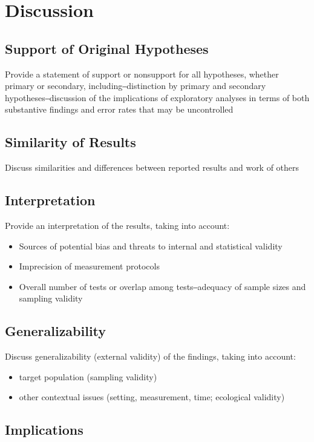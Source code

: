\documentclass[acmsmall]{acmart}
\begin{document}
\section{Discussion}
\subsection{Support of Original Hypotheses}
Provide a statement of support or nonsupport for all hypotheses, whether primary or secondary, including‒distinction by primary and secondary hypotheses‒discussion of the implications of exploratory analyses in terms of both substantive findings and error rates that may be uncontrolled

\subsection{Similarity of Results}
Discuss similarities and differences between reported results and work of others

\subsection{Interpretation}

Provide an interpretation of the results, taking into account:

\begin{itemize}
    \item Sources of potential bias and threats to internal and statistical validity
    \item Imprecision of measurement protocols
    \item Overall number of tests or overlap among tests‒adequacy of sample sizes and sampling validity
\end{itemize}


\subsection{Generalizability}

Discuss generalizability (external validity) of the findings, taking into account:
\begin{itemize}
    \item target population (sampling validity)
    \item other contextual issues (setting, measurement, time; ecological validity)
\end{itemize}

\subsection{Implications}
\end{document}
